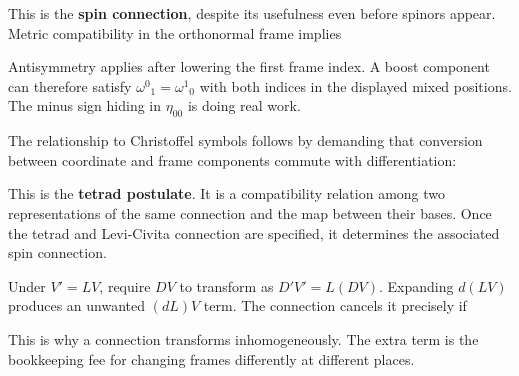 \documentclass[
  11pt,
  letterpaper,
  oneside,
  openany]{scrbook}
\begin{document}
This is the \textbf{spin connection}, despite its usefulness even before
spinors appear. Metric compatibility in the orthonormal frame implies

\begin{center}
\begingroup
{}
\ifdim\wd\grmathbox>\linewidth
\resizebox{\linewidth}{!}{\usebox{\grmathbox}}
\else\usebox{\grmathbox}\fi
\endgroup
\end{center}

Antisymmetry applies after lowering the first frame index. A boost
component can therefore satisfy \(\omega^0{}_1=\omega^1{}_0\) with both
indices in the displayed mixed positions. The minus sign hiding in
\(\eta_{00}\) is doing real work.

The relationship to Christoffel symbols follows by demanding that
conversion between coordinate and frame components commute with
differentiation:

\begin{center}
\begingroup
{}
\ifdim\wd\grmathbox>\linewidth
\resizebox{\linewidth}{!}{\usebox{\grmathbox}}
\else\usebox{\grmathbox}\fi
\endgroup
\end{center}

This is the \textbf{tetrad postulate}. It is a compatibility relation
among two representations of the same connection and the map between
their bases. Once the tetrad and Levi-Civita connection are specified,
it determines the associated spin connection.

Under \(V'=LV\), require \(DV\) to transform as \(D'V'=L(DV)\).
Expanding \(d(LV)\) produces an unwanted \((dL)V\) term. The connection
cancels it precisely if

\begin{center}
\begingroup
{}
\ifdim\wd\grmathbox>\linewidth
\resizebox{\linewidth}{!}{\usebox{\grmathbox}}
\else\usebox{\grmathbox}\fi
\endgroup
\end{center}

This is why a connection transforms inhomogeneously. The extra term is
the bookkeeping fee for changing frames differently at different places.
\end{document}
